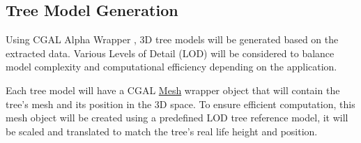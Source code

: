 \documentclass[12pt]{article}
\begin{document}
\subsection{Tree Model Generation}
Using CGAL Alpha Wrapper \cite{cgal_alpha_wrapper}, 3D tree models will be generated based on the extracted data. Various 
Levels of Detail (LOD) will be considered to balance model complexity and computational 
efficiency depending on the application.

Each tree model will have a CGAL \href{https://doc.cgal.org/latest/Surface_mesh/classCGAL_1_1Surface__mesh.html}{Mesh} 
wrapper object that will contain the tree's
mesh and its position in the 3D space. To ensure efficient computation, this 
mesh object will be created using a predefined LOD tree reference model, it will
be scaled and translated to match the tree's real life height and position.
\end{document}
